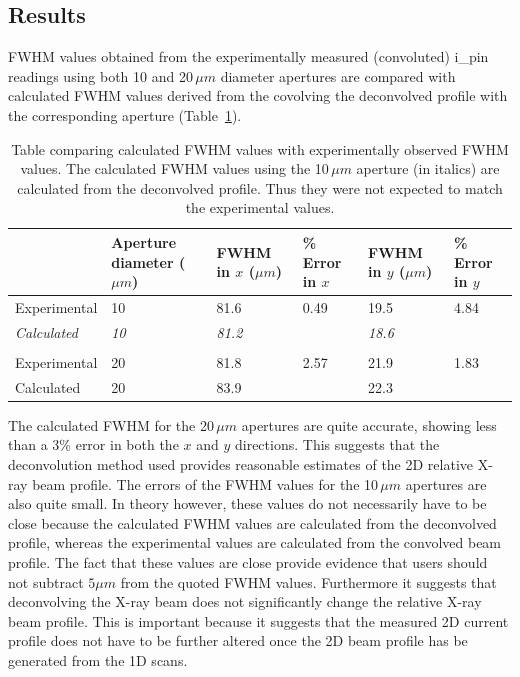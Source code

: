 \subsection{Results}
\label{sub:Results - DLS}
FWHM values obtained from the experimentally measured (convoluted) i\_pin readings using both 10 and 20$\,\mu m$ diameter apertures are compared with calculated FWHM values derived from the covolving the deconvolved profile with the corresponding aperture (Table~\ref{tab:FWHM comparison - DLS}).
\begin{table}[h!]
	\caption{Table comparing calculated FWHM values with experimentally observed FWHM values.
    The calculated FWHM values using the 10$\,\mu m$ aperture (in italics) are calculated from the deconvolved profile.
    Thus they were not expected to match the experimental values.}
	\begin{tabular}{p{2.5cm} p{2.5cm} p{2cm} p{1.5cm} p{2cm} p{1.5cm}}
        &  Aperture diameter ($\mu m$) & FWHM in $x$ ($\mu m$) 	&	\% Error in $x$		& FWHM in $y$ ($\mu m$) 	&	\% Error in $y$ \\
		\hline
		Experimental              & 10              & 81.6 	            &	0.49      & 19.5 	        & 4.84	\\
		\textit{Calculated}       & \textit{10}     & \textit{81.2}     &  	          & \textit{18.6} 	&		\\
                                  &                 &			        &			  &    		        &		\\
        Experimental              & 20              & 81.8              &   2.57      & 21.9            & 1.83  \\
		Calculated                & 20              & 83.9              &             & 22.3            &    	\\
	\end{tabular}
	\label{tab:FWHM comparison - DLS}
\end{table}
The calculated FWHM for the 20$\,\mu m$ apertures are quite accurate, showing less than a 3\% error in both the $x$ and $y$ directions.
This suggests that the deconvolution method used provides reasonable estimates of the 2D relative X-ray beam profile.
The errors of the FWHM values for the 10$\,\mu m$ apertures are also quite small.
In theory however, these values do not necessarily have to be close because the calculated FWHM values are calculated from the deconvolved profile, whereas the experimental values are calculated from the convolved beam profile.
The fact that these values are close provide evidence that users should not subtract $5 \mu m$ from the quoted FWHM values.
Furthermore it suggests that deconvolving the X-ray beam does not significantly change the relative X-ray beam profile.
This is important because it suggests that the measured 2D current profile does not have to be further altered once the 2D beam profile has be generated from the 1D scans.
